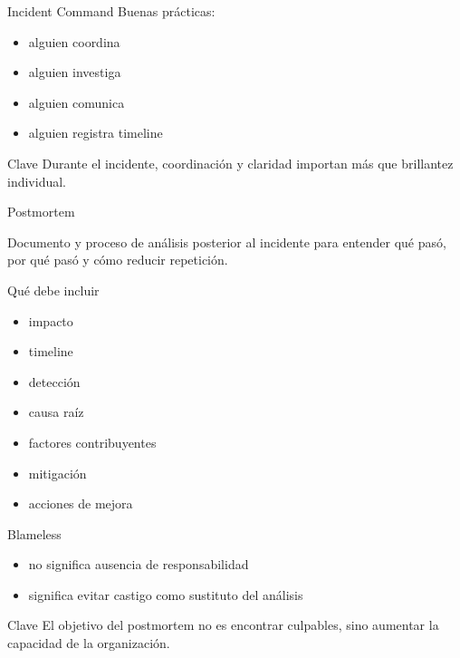\documentclass[institutional,screen,none]{ua-engineering-v6-beamer}
\begin{document}
\begin{frame}{Incident Command}
Buenas prácticas:
\begin{itemize}
\item alguien coordina
\item alguien investiga
\item alguien comunica
\item alguien registra timeline
\end{itemize}

\pause

\begin{block}{Clave}
Durante el incidente, coordinación y claridad importan más que brillantez individual.
\end{block}
\end{frame}


\begin{frame}{Postmortem}
\begin{block}{}
Documento y proceso de análisis posterior al incidente para entender qué pasó, por qué pasó y cómo reducir repetición.
\end{block}
\end{frame}

\begin{frame}{Qué debe incluir}
\begin{itemize}
\item impacto
\item timeline
\item detección
\item causa raíz
\item factores contribuyentes
\item mitigación
\item acciones de mejora
\end{itemize}
\end{frame}

\begin{frame}{Blameless}
\begin{itemize}
\item no significa ausencia de responsabilidad
\item significa evitar castigo como sustituto del análisis
\end{itemize}

\pause

\begin{alertblock}{Clave}
El objetivo del postmortem no es encontrar culpables, sino aumentar la capacidad de la organización.
\end{alertblock}
\end{frame}
\end{document}
